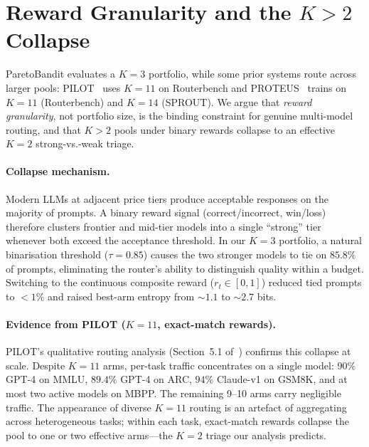 \section{Reward Granularity and the \texorpdfstring{$K{>}2$}{K>2} Collapse}
\label{appendix:reward_discrimination}

ParetoBandit evaluates a $K{=}3$ portfolio, while some prior systems route across larger pools: PILOT~\cite{panda2025pilot} uses $K{=}11$ on Routerbench and PROTEUS~\cite{bhatti2026proteus} trains on $K{=}11$ (Routerbench) and $K{=}14$ (SPROUT).  We argue that \emph{reward granularity}, not portfolio size, is the binding constraint for genuine multi-model routing, and that $K{>}2$ pools under binary rewards collapse to an effective $K{=}2$ strong-vs.-weak triage.

\paragraph{Collapse mechanism.}
Modern LLMs at adjacent price tiers produce acceptable responses on the majority of prompts.  A binary reward signal (correct/incorrect, win/loss) therefore clusters frontier and mid-tier models into a single ``strong'' tier whenever both exceed the acceptance threshold.  In our $K{=}3$ portfolio, a natural binarisation threshold ($\tau{=}0.85$) causes the two stronger models to tie on $85.8\%$ of prompts, eliminating the router's ability to distinguish quality within a budget.  Switching to the continuous composite reward ($r_t \in [0,1]$) reduced tied prompts to ${<}1\%$ and raised best-arm entropy from ${\sim}1.1$ to ${\sim}2.7$ bits.

\paragraph{Evidence from PILOT ($K{=}11$, exact-match rewards).}
PILOT's qualitative routing analysis (Section~5.1 of~\cite{panda2025pilot}) confirms this collapse at scale.  Despite $K{=}11$ arms, per-task traffic concentrates on a single model: $90\%$ GPT-4 on MMLU, $89.4\%$ GPT-4 on ARC, $94\%$ Claude-v1 on GSM8K, and at most two active models on MBPP.  The remaining 9--10 arms carry negligible traffic.  The appearance of diverse $K{=}11$ routing is an artefact of aggregating across heterogeneous tasks; within each task, exact-match rewards collapse the pool to one or two effective arms---the $K{=}2$ triage our analysis predicts.

